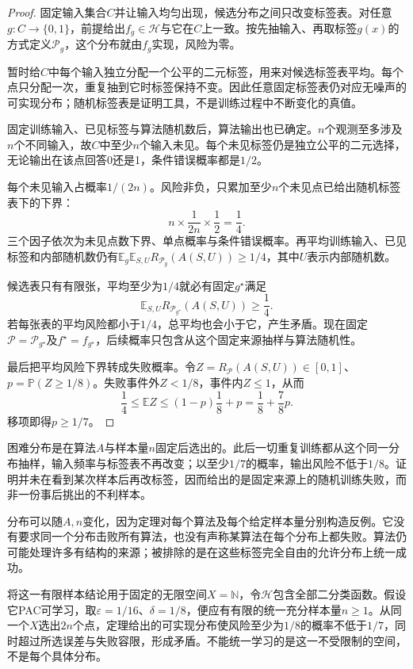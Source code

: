 \begin{proof}
固定输入集合$C$并让输入均匀出现，候选分布之间只改变标签表。对任意$g:C\to\{0,1\}$，前提给出$f_g\in\mathcal H$与它在$C$上一致。按先抽输入、再取标签$g(x)$的方式定义$\mathcal P_g$，这个分布就由$f_g$实现，风险为零。

暂时给$C$中每个输入独立分配一个公平的二元标签，用来对候选标签表平均。每个点只分配一次，重复抽到它时标签保持不变。因此任意固定标签表仍对应无噪声的可实现分布；随机标签表是证明工具，不是训练过程中不断变化的真值。

固定训练输入、已见标签与算法随机数后，算法输出也已确定。$n$个观测至多涉及$n$个不同输入，故$C$中至少$n$个输入未见。每个未见标签仍是独立公平的二元选择，无论输出在该点回答0还是1，条件错误概率都是$1/2$。

每个未见输入占概率$1/(2n)$。风险非负，只累加至少$n$个未见点已给出随机标签表下的下界：
\begin{equation}
 n\times\frac1{2n}\times\frac12=\frac14.
 \label{eq:no-free-lunch-expected-risk}
\end{equation}
三个因子依次为未见点数下界、单点概率与条件错误概率。再平均训练输入、已见标签和内部随机数仍有$\mathbb E_g\mathbb E_{S,U}R_{\mathcal P_g}(A(S,U))\geq1/4$，其中$U$表示内部随机数。

候选表只有有限张，平均至少为$1/4$就必有固定$g^\star$满足
\[
 \mathbb E_{S,U}R_{\mathcal P_{g^\star}}(A(S,U))\geq\frac14.
\]
若每张表的平均风险都小于$1/4$，总平均也会小于它，产生矛盾。现在固定$\mathcal P=\mathcal P_{g^\star}$及$f^\star=f_{g^\star}$，后续概率只包含从这个固定来源抽样与算法随机性。

最后把平均风险下界转成失败概率。令$Z=R_{\mathcal P}(A(S,U))\in[0,1]$、$p=\mathbb P(Z\geq1/8)$。失败事件外$Z<1/8$，事件内$Z\leq1$，从而
\[
 \frac14\leq\mathbb E Z\leq(1-p)\frac18+p
 =\frac18+\frac78p.
\]
移项即得$p\geq1/7$。\end{proof}

困难分布是在算法$A$与样本量$n$固定后选出的。此后一切重复训练都从这个同一分布抽样，输入频率与标签表不再改变；以至少$1/7$的概率，输出风险不低于$1/8$。证明并未在看到某次样本后再改标签，因而给出的是固定来源上的随机训练失败，而非一份事后挑出的不利样本。

分布可以随$A,n$变化，因为定理对每个算法及每个给定样本量分别构造反例。它没有要求同一个分布击败所有算法，也没有声称某算法在每个分布上都失败。算法仍可能处理许多有结构的来源；被排除的是在这些标签完全自由的允许分布上统一成功。

将这一有限样本结论用于固定的无限空间$X=\mathbb N$，令$\mathcal H$包含全部二分类函数。假设它PAC可学习，取$\varepsilon=1/16$、$\delta=1/8$，便应有有限的统一充分样本量$n\geq1$。从同一个$X$选出$2n$个点，定理给出的可实现分布使风险至少为$1/8$的概率不低于$1/7$，同时超过所选误差与失败容限，形成矛盾。不能统一学习的是这一不受限制的空间，不是每个具体分布。

